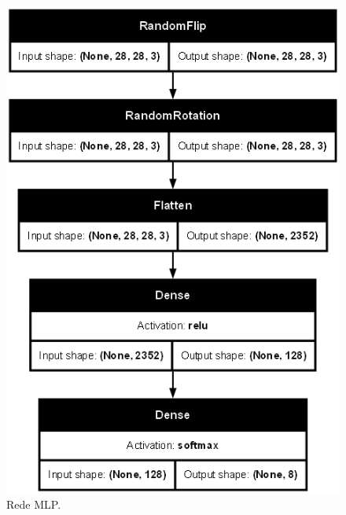 \documentclass[final,5p]{elsarticle}
\numberwithin{equation}{section}
\begin{document}
\begin{figure}[H]
    \includegraphics[width=0.95\columnwidth]{MLP_model.png}
    \caption{Rede MLP.}\label{fig:ModeloMLP}
\end{figure}
\end{document}
